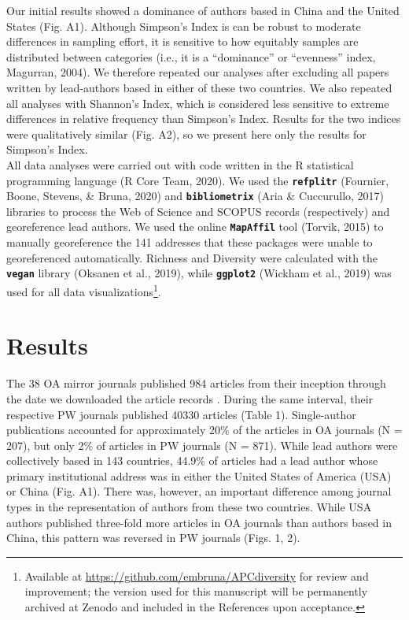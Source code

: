 \documentclass[english,man]{apa6}
\begin{document}
Our initial results showed a dominance of authors based in China and the United States (Fig. A1). Although Simpson's Index is can be robust to moderate differences in sampling effort, it is sensitive to how equitably samples are distributed between categories (i.e., it is a ``dominance'' or ``evenness'' index, Magurran, 2004). We therefore repeated our analyses after excluding all papers written by lead-authors based in either of these two countries. We also repeated all analyses with Shannon's Index, which is considered less sensitive to extreme differences in relative frequency than Simpson's Index. Results for the two indices were qualitatively similar (Fig. A2), so we present here only the results for Simpson's Index.\\
All data analyses were carried out with code written in the R statistical programming language (R Core Team, 2020). We used the \textbf{\texttt{refplitr}} (Fournier, Boone, Stevens, \& Bruna, 2020) and \textbf{\texttt{bibliometrix}} (Aria \& Cuccurullo, 2017) libraries to process the Web of Science and SCOPUS records (respectively) and georeference lead authors. We used the online \textbf{\texttt{MapAffil}} tool (Torvik, 2015) to manually georeference the 141 addresses that these packages were unable to georeferenced automatically. Richness and Diversity were calculated with the \textbf{\texttt{vegan}} library (Oksanen et al., 2019), while \textbf{\texttt{ggplot2}} (Wickham et al., 2019) was used for all data visualizations\footnote{Available at \url{https://github.com/embruna/APCdiversity} for review and improvement; the version used for this manuscript will be permanently archived at Zenodo and included in the References upon acceptance.}.

\hypertarget{results}{%
\section{Results}\label{results}}

The 38 OA mirror journals published 984 articles from their inception through the date we downloaded the article records . During the same interval, their respective PW journals published 40330 articles (Table 1). Single-author publications accounted for approximately 20\% of the articles in OA journals (N = 207), but only 2\% of articles in PW journals (N = 871). While lead authors were collectively based in 143 countries, 44.9\% of articles had a lead author whose primary institutional address was in either the United States of America (USA) or China (Fig. A1). There was, however, an important difference among journal types in the representation of authors from these two countries. While USA authors published three-fold more articles in OA journals than authors based in China, this pattern was reversed in PW journals (Figs. 1, 2).
\end{document}
